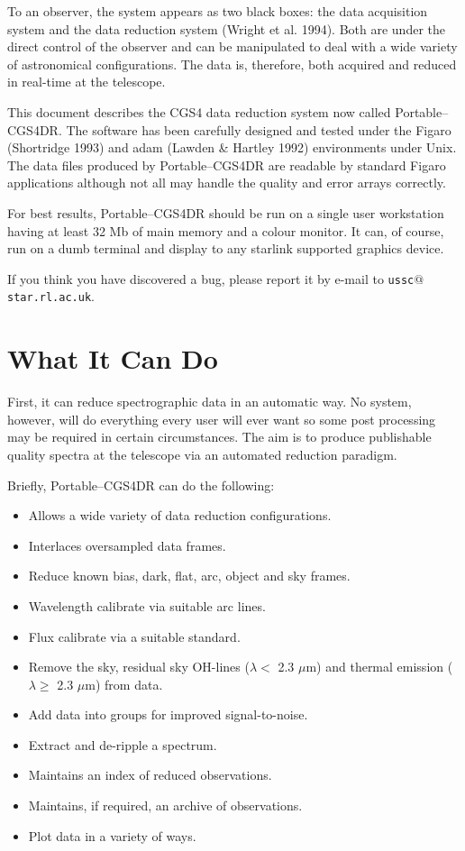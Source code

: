 \documentclass[a4paper]{book}
\renewcommand{\_}{{\tt\char'137}}
\begin{document}
To an observer, the system appears as two black boxes: the data
acquisition system and the data reduction system (Wright et al. 1994).
Both are under the direct control of the observer and can be
manipulated to deal with a wide variety of astronomical configurations.
The data is, therefore, both acquired and reduced in real-time at the
telescope.

This document describes the CGS4 data reduction system now called
Portable--CGS4DR. The software has been carefully designed and tested
under the Figaro (Shortridge 1993) and {\sc adam} (Lawden \& Hartley 1992)
environments under Unix.  The data files produced by Portable--CGS4DR
are readable by standard Figaro applications although not all may
handle the quality and error arrays correctly.

For best results, Portable--CGS4DR should be run on a single user
workstation having at least 32 Mb of main memory and a colour monitor.
It can, of course, run on a dumb terminal and display to any {\sc
starlink} supported graphics device.

If you think you have discovered a bug, please report it by e-mail to
{\tt ussc$@$star.rl.ac.uk}.

\section{What It Can Do}
First, it can reduce spectrographic data in an automatic way.  No
system, however, will do everything every user will ever want so some
post processing may be required in certain circumstances. The aim is to
produce publishable quality spectra at the telescope via an automated
reduction paradigm.

Briefly, Portable--CGS4DR can do the following:

\begin{itemize}
\item Allows a wide variety of data reduction configurations.
\item Interlaces oversampled data frames.
\item Reduce known {\sc bias}, {\sc dark}, {\sc flat}, {\sc arc}, {\sc object}
and {\sc sky} frames.
\item Wavelength calibrate via suitable {\sc arc} lines.
\item Flux calibrate via a suitable {\sc standard}.
\item Remove the {\sc sky}, residual sky OH-lines ($\lambda <$ 2.3 $\mu$m) 
  and thermal emission ($\lambda \geq$ 2.3 $\mu$m) from data. 
\item Add data into groups for improved signal-to-noise.
\item Extract and de-ripple a spectrum.
\item Maintains an index of reduced observations.
\item Maintains, if required, an archive of observations.
\item Plot data in a variety of ways.
\end{itemize}
\end{document}
